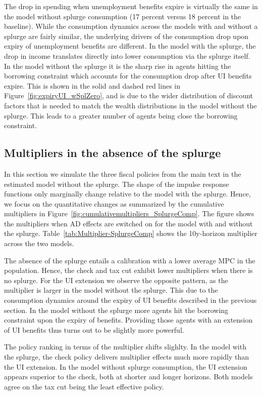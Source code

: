 \documentclass[\latexroot/\projectname]{subfiles}
\begin{document}
The drop in spending when unemployment benefits expire is virtually the same in the model without splurge consumption (17 percent versus 18 percent in the baseline).
While the consumption dynamics across the models with and without a splurge are fairly similar, the underlying drivers of the consumption drop upon expiry of unemployment benefits are different.
In the model with the splurge, the drop in income translates directly into lower consumption via the splurge itself.
In the model without the splurge it is the sharp rise in agents hitting the borrowing constraint which accounts for the consumption drop after UI benefits expire.
This is shown in the solid and dashed red lines in Figure~\ref{fig:expiryUI_wSplZero}, and is due to the wider distribution of discount factors that is needed to match the wealth distributions in the model without the splurge. This leads to a greater number of agents being close the borrowing constraint.



\subsection{Multipliers in the absence of the splurge}
\whenintegrated{\label{app:nosplurge-multipliers}} 

In this section we simulate the three fiscal policies from the main text in the estimated model without the splurge. The shape of the impulse response functions only marginally change relative to the model with the splurge. Hence, we focus on the quantitative changes as summarized by the cumulative multipliers in Figure~\ref{fig:cumulativemultipliers_SplurgeComp}.
The figure shows the multipliers when AD effects are switched on for the model with and without the splurge.
Table~\ref{tab:Multiplier-SplurgeComp} shows the 10y-horizon multiplier across the two models.

The absence of the splurge entails a calibration with a lower average MPC in the population.
Hence, the check and tax cut exhibit lower multipliers when there is no splurge.
For the UI extension we observe the opposite pattern, as the multiplier is larger in the model without the splurge.
This due to the consumption dynamics around the expiry of UI benefits described in the previous section.
In the model without the splurge more agents hit the borrowing constraint upon the expiry of benefits.
Providing those agents with an extension of UI benefits thus turns out to be slightly more powerful.

The policy ranking in terms of the multiplier shifts slighlty.
In the model with the splurge, the check policy delivers multiplier effects much more rapidly than the UI extension.
In the model without splurge consumption, the UI extension appears superior to the check, both at shorter and longer horizons.
Both models agree on the tax cut being the least effective policy.





\FloatBarrier

\smartbib
\end{document}
